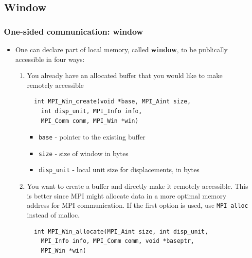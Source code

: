 \documentclass{beamer}
\begin{document}
\subsection{Window}
\begin{frame}[fragile]
  \frametitle{One-sided communication: window}
\begin{itemize}
\item One can declare part of local memory, called {\color{mycolordef}\textbf{window}}, to be publically accessible in four ways:
\begin{enumerate}
\item You already have an allocated buffer that you
would like to make remotely accessible
{\color{mycolorcode}
\begin{verbatim}
  int MPI_Win_create(void *base, MPI_Aint size, 
    int disp_unit, MPI_Info info,
    MPI_Comm comm, MPI_Win *win)
\end{verbatim}
}
\begin{itemize}
\item {\color{mycolorcode}\verb|base|} - pointer to the existing buffer
\item {\color{mycolorcode}\verb|size|} - size of window in bytes
\item {\color{mycolorcode}\verb|disp_unit|} - local unit size for displacements, in bytes 
\end{itemize}
\item  You want to create a buffer and directly make it
remotely accessible. This is better since MPI might allocate data in a more optimal memory address for MPI communication. If the first option is used, use {\color{mycolorcode}\verb|MPI_alloc|} instead of malloc.
{\color{mycolorcode}
\begin{verbatim}
  int MPI_Win_allocate(MPI_Aint size, int disp_unit, 
    MPI_Info info, MPI_Comm comm, void *baseptr, 
    MPI_Win *win)
\end{verbatim}
}
\end{enumerate}
\end{itemize}
\end{frame}
\end{document}
